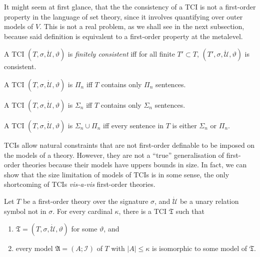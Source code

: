 \documentclass[12pt]{article}
\numberwithin{equation}{section}
\begin{document}
\begin{rem}\label{promise}
It might seem at first glance, that the the consistency of a TCI is not a first-order property in the language of set theory, since it involves quantifying over outer models of $V$. This is not a real problem, as we shall see in the next subsection, because said definition is equivalent to a first-order property at the metalevel.
\end{rem}

\begin{defi}
A TCI $(T, \sigma, \dot{\mathcal{U}}, \vartheta)$ is \emph{finitely consistent} iff for all finite $T' \subset T$, $(T', \sigma, \dot{\mathcal{U}}, \vartheta)$ is consistent. 
\end{defi}

\begin{defi}
A TCI $(T, \sigma, \dot{\mathcal{U}}, \vartheta)$ is $\Pi_n$ iff $T$ contains only $\Pi_n$ sentences.

A TCI $(T, \sigma, \dot{\mathcal{U}}, \vartheta)$ is $\Sigma_n$ iff $T$ contains only $\Sigma_n$ sentences.

A TCI $(T, \sigma, \dot{\mathcal{U}}, \vartheta)$ is $\Sigma_n \cup \Pi_n$ iff every sentence in $T$ is either $\Sigma_n$ or $\Pi_n$.
\end{defi}

TCIs allow natural constraints that are not first-order definable to be imposed on the models of a theory. However, they are not a ``true'' generalisation of first-order theories because their models have uppers bounds in size. In fact, we can show that the size limitation of models of TCIs is in some sense, the only shortcoming of TCIs \emph{vis-a-vis} first-order theories. 

\begin{lem}\label{lem511}
Let $T$ be a first-order theory over the signature $\sigma$, and $\dot{\mathcal{U}}$ be a unary relation symbol not in $\sigma$. For every cardinal $\kappa$, there is a TCI $\mathfrak{T}$ such that 
\begin{enumerate}[label=(\alph*)]
    \item $\mathfrak{T} = (T, \sigma, \dot{\mathcal{U}}, \vartheta)$ for some $\vartheta$, and
    \item every model $\mathfrak{A} = (A; \mathcal{I})$ of $T$ with $|A| \leq \kappa$ is isomorphic to some model of $\mathfrak{T}$.
\end{enumerate}
\end{lem}
\end{document}
